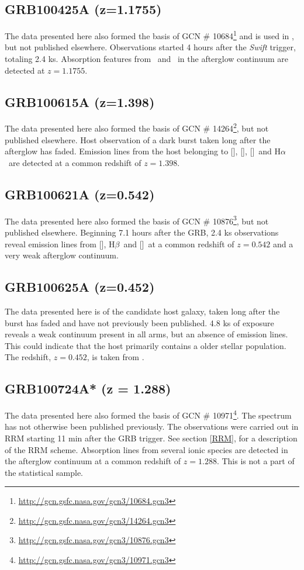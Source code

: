 \documentclass[iop, twocolappendix, numberedappendix, tighten, appendixfloats]{emulateapj}
\newcommand{\hb}{H$\beta$}
\newcommand{\ha}{H$\alpha$}
\newcommand{\oii}{[\ion{O}{2}]}
\newcommand{\oiii}{[\ion{O}{3}]}
\newcommand{\neiii}{[\ion{Ne}{3}]}
\newcommand{\feii}{\ion{Fe}{2}}
\newcommand{\mgii}{\ion{Mg}{2}}
\begin{document}
	\subsection{GRB100425A (z=1.1755)}
	The data presented here also formed the basis of GCN \#
	10684\footnote{\url{http://gcn.gsfc.nasa.gov/gcn3/10684.gcn3}} and is used in
	\citet{Skuladottir2010}, but not published elsewhere. Observations started 4
	hours after the \textit{Swift} trigger, totaling 2.4 ks. Absorption features
	from \mgii~and \feii~in the afterglow continuum are detected at $z=1.1755$.

	\subsection{GRB100615A (z=1.398)}
	The data presented here also formed the basis of GCN \#
	14264\footnote{\url{http://gcn.gsfc.nasa.gov/gcn3/14264.gcn3}}, but not
	published elsewhere. Host observation of a dark burst\citep{DElia2011} taken
	long after the afterglow has faded. Emission lines from the host belonging to
	\oii, \neiii, \oiii~and \ha~are detected at a common redshift of $z=1.398$.
	
	\subsection{GRB100621A (z=0.542)}
	The data presented here also formed the basis of GCN \#
	10876\footnote{\url{http://gcn.gsfc.nasa.gov/gcn3/10876.gcn3}}, but not
	published elsewhere. Beginning 7.1 hours after the GRB, 2.4 ks observations
	reveal emission lines from \oii, \hb~and \oiii~at a common redshift of
	$z=0.542$ and a very weak afterglow continuum.

	\subsection{GRB100625A (z=0.452)}
	The data presented here is of the candidate host galaxy, taken long after the
	burst has faded and have not previously been published. 4.8 ks of exposure
	reveals a weak continuum present in all arms, but an absence of emission lines.
	This could indicate that the host primarily contains a older stellar
	population. The redshift, $z=0.452$, is taken from \citet{Fong2013}.

	
	\subsection{GRB100724A* (z = 1.288)}
	The data presented here also formed the basis of GCN \#
	10971\footnote{\url{http://gcn.gsfc.nasa.gov/gcn3/10971.gcn3}}. The spectrum
	has not otherwise been published previously. The observations were carried out
	in RRM starting 11 min after the GRB trigger. See section \ref{RRM}, for a
	description of the RRM scheme. Absorption lines from several ionic species are
	detected in the afterglow continuum at a common redshift of $z = 1.288$. This
	is not a part of the statistical sample.
\end{document}
